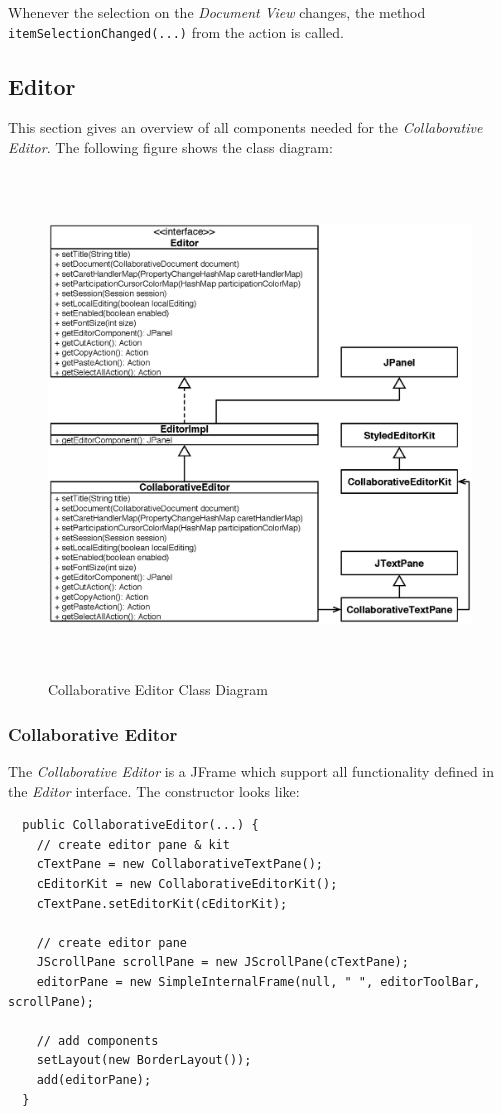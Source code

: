Whenever the selection on the \textit{Document View} changes, the method \texttt{itemSelectionChanged(...)} from the action is called.



\subsection{Editor}
This section gives an overview of all components needed for the \textit{Collaborative Editor}. The following figure shows the class diagram:
\begin{figure}[H]
\begin{center}
  \includegraphics[height=5.25in, width=5.55in]{../images/finalreport/application_editor.eps}
\caption{Collaborative Editor Class Diagram}
\label{application_editor}
\end{center}
\end{figure}

\subsubsection{Collaborative Editor}
The \textit{Collaborative Editor} is a JFrame which support all functionality defined in the \textit{Editor} interface. The constructor looks like:
\begin{verbatim}
  public CollaborativeEditor(...) {
    // create editor pane & kit
    cTextPane = new CollaborativeTextPane();
    cEditorKit = new CollaborativeEditorKit();
    cTextPane.setEditorKit(cEditorKit);

    // create editor pane
    JScrollPane scrollPane = new JScrollPane(cTextPane);
    editorPane = new SimpleInternalFrame(null, " ", editorToolBar, scrollPane);

    // add components		
    setLayout(new BorderLayout());
    add(editorPane);    
  }
\end{verbatim}

